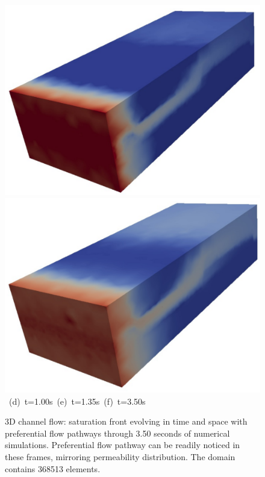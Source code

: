 \begin{landscape}
\begin{figure}[ht]
{{            \includegraphics[width=.5\textwidth]{./Pics1/3D_Channel/3D_channel_sat_150.pdf}
            \includegraphics[width=.5\textwidth]{./Pics1/3D_Channel/3D_channel_sat_490.pdf} }
      \hbox{\hspace{2.cm} (d) t=1.00s \hspace{5.cm} (e) t=1.35s\hspace{4.cm} (f) t=3.50s  } }
\caption{3D channel flow: saturation front evolving in time and space with preferential flow pathways through 3.50 seconds of numerical simulations. Preferential flow pathway can be readily noticed in these frames, mirroring permeability distribution. The domain contains 368513  elements.}
\label{fig:3DChannel_sat}
\end{figure}
\end{landscape}
\clearpage



